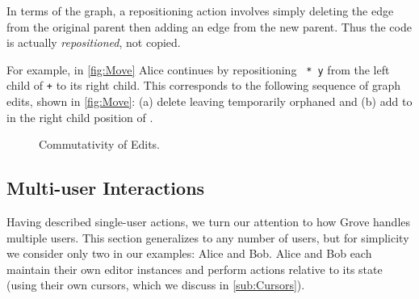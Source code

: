 In terms of the graph, a repositioning action involves simply deleting the edge
from the original parent then adding an edge from the new parent.
Thus the code is actually \textit{repositioned}, not copied.

For example, in \autoref{fig:Move} Alice continues by
repositioning \texttt{\hole{} * y} from the left child of \texttt{+} to its right child.
This corresponds to the following sequence of graph edits, shown in \autoref{fig:Move}:
(a) delete \eWrapTimes{} leaving \vSimpleTimes{} temporarily orphaned and
(b) add \eMoveTimes{} to \vSimpleTimes{} in the right child position of \vWrapPlus{}.

\figureDifferentPartsNestedParts{}

\begin{figure}
  \centering
  \caption{Commutativity of Edits.}
  \label{fig:Commutativity}
\end{figure}

\subsection{Multi-user Interactions}%
\label{sub:Multi-user Interactions}

Having described single-user actions,
we turn our attention to how Grove handles multiple users.
This section generalizes to any number of users,
but for simplicity we consider only two in our examples: Alice and Bob.
Alice and Bob each maintain their own editor instances and perform
actions relative to its state (using their own cursors, which we discuss in \autoref{sub:Cursors}).

